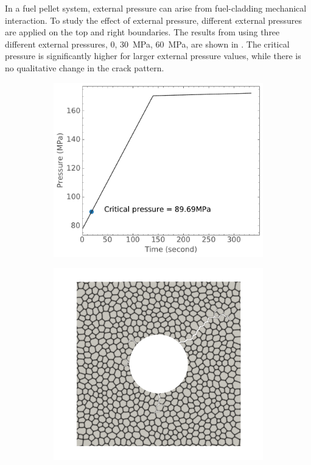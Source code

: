 In a fuel pellet system, external pressure can arise from fuel-cladding mechanical interaction. To study the effect of external pressure, different external pressures are applied on the top and right boundaries.  The results from using three different external pressures, 0, \SI{30}{\mega\pascal}, \SI{60}{\mega\pascal}, are shown in . The critical pressure is significantly higher for larger external pressure values, while there is no qualitative change in the crack pattern.

\begin{figure}[htb!]
  \centering
  \begin{subfigure}[t]{0.32\linewidth}
    \centering
    \includegraphics[width=\linewidth]{Chapter3/figures/bubble_pressure_r0.5_ext0_rod196}
    \caption{}
  \end{subfigure}
  \begin{subfigure}[t]{0.32\linewidth}
    \centering
    \includegraphics[width=\linewidth]{Chapter3/figures/r5_ext0}

\end{subfigure}
\end{figure}
